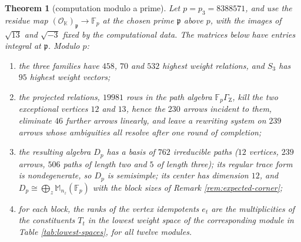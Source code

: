 \documentclass[leqno]{article}
\newcommand{\K}{\ensuremath{\mathbb{K}}}
\newcommand{\Mat}{\ensuremath{\mathbb{M}}}
\newtheorem{thm}{Theorem}[section]
\numberwithin{equation}{section}
\begin{document}
\begin{thm}[computation modulo a prime]
\label{thm:zhu-modp}
Let $p = p_3 = 8388571$, and use the residue map $(\mathcal O_{\K})_{\mathfrak p} \to \mathbb F_p$ at the chosen prime $\mathfrak p$ above $p$, with the images of $\sqrt{13}$ and $\sqrt{-3}$ fixed by the computational data. The matrices below have entries integral at $\mathfrak p$. Modulo $p$:
\begin{enumerate}
\item the three families have $458$, $70$ and $532$ highest weight relations, and $S_3$ has $95$ highest weight vectors;
\item the projected relations, $19981$ rows in the path algebra $\mathbb F_p\Gamma_{\mathrm Z}$, kill the two exceptional vertices $12$ and $13$, hence the $230$ arrows incident to them, eliminate $46$ further arrows linearly, and leave a rewriting system on $239$ arrows whose ambiguities all resolve after one round of completion;
\item the resulting algebra $D_p$ has a basis of $762$ irreducible paths ($12$ vertices, $239$ arrows, $506$ paths of length two and $5$ of length three); its regular trace form is nondegenerate, so $D_p$ is semisimple; its center has dimension $12$, and $D_p \cong \bigoplus_{z}\Mat_{n_z}(\mathbb F_p)$ with the block sizes of Remark \ref{rem:expected-corner};
\item for each block, the ranks of the vertex idempotents $e_t$ are the multiplicities of the constituents $T_t$ in the lowest weight space of the corresponding module in Table \ref{tab:lowest-spaces}, for all twelve modules.
\end{enumerate}
\end{thm}
\end{document}
